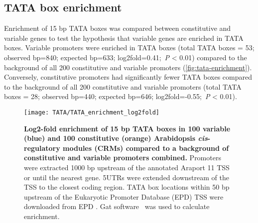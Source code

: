 \documentclass[../main.tex]{subfiles}
\begin{document}
\subsection{TATA box enrichment}

Enrichment of 15 bp TATA boxes was compared between constitutive and
variable genes to test the hypothesis that variable genes are enriched in TATA boxes.
Variable promoters were enriched in TATA boxes (total TATA boxes = 53; observed bp=840; expected bp=633; log2fold=0.41;~\textit{P} \textless{} 0.01) compared to the background of all 200 constitutive and variable promoters
(\autoref{fig:tata-enrichment}).
Conversely, constitutive promoters had significantly fewer TATA boxes compared to the background of all 200 constitutive and variable promoters (total TATA boxes = 28; observed bp=440; expected bp=646; log2fold=-0.55;~\textit{P} \textless{} 0.01).

\begin{figure}[!h]
	\begin{center}
		\capstart
		\texttt{[image: TATA/TATA\_enrichment\_log2fold]}
		\caption{
			\textbf{Log2\hyp{}fold enrichment of 15 bp TATA boxes in 100 variable (blue) and 100 constitutive (orange) Arabidopsis \textit{cis}\hyp{}regulatory modules (CRMs) compared to a background of constitutive and variable promoters combined.}
			Promoters were extracted 1000 bp upstream of the annotated Araport 11 \autocite{chengAraport11CompleteReannotation2017} TSS or until the nearest gene.
			5UTRs were extended downstream of the TSS to the closest coding region.
			TATA box locations within 50 bp upstream of the Eukaryotic Promoter Database (EPD) TSS were downloaded from EPD \autocite{dreosInfluenceRotationalNucleosome2016}.
			 Gat software~\autocite{hegerGATSimulationFramework2013} was used to calculate enrichment.
			\label{fig:tata-enrichment}
		}
	\end{center}
\end{figure}
\end{document}
